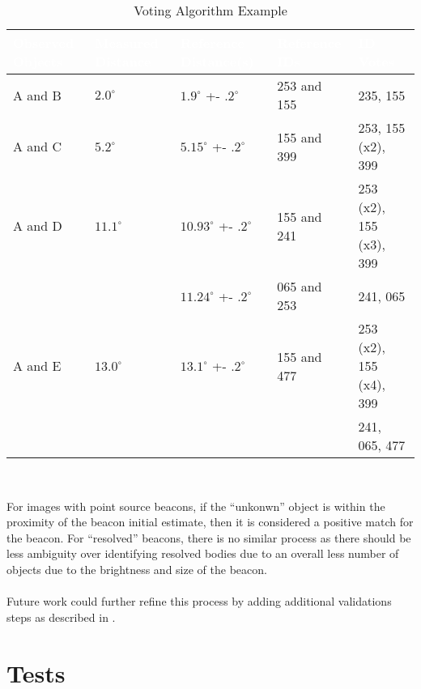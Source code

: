 \documentclass[]{DINOReportMemo}
\begin{document}
\begin{table}[H]
	\centering
	\caption{Voting Algorithm Example}
	\begin{tabular}{|l|l|l|l|l|}
		\hline
		\rowcolor{CU_Gold}
		\textcolor{white}{Observed Objects} & 
		\textcolor{white}{Measured Distance} & 
		\textcolor{white}{Reference Distance(s)} & 
		\textcolor{white}{Reference IDs} &
		\textcolor{white}{ID Votes}  \\ \hline
		A and B & $2.0^{\circ}$ & $1.9^{\circ}$ +- $.2^{\circ}$ 
		& 253 and 155 & 235, 155 \\ \hline
		A and C & $5.2^{\circ}$ & $5.15^{\circ}$ +- $.2^{\circ}$ 
		& 155 and 399 & 253, 155 (x2), 399 \\ \hline		
		A and D & $11.1^{\circ}$ & $10.93^{\circ}$ +- $.2^{\circ}$ 
		& 155 and 241 & 253 (x2), 155 (x3), 399 \\ 
		& & $11.24^{\circ}$ +- $.2^{\circ}$ 
		& 065 and 253 & 241, 065 \\ \hline
		A and E & $13.0^{\circ}$ & $13.1^{\circ}$ +- $.2^{\circ}$ 
		& 155 and 477 & 253 (x2), 155 (x4), 399 \\
		& & & & 241, 065, 477 \\ \hline	
	\end{tabular}
	\label{tab:voting} \\
\end{table} 

\noindent For images with point source beacons, if the ``unkonwn'' object is within the proximity of the beacon initial estimate, then it is considered a positive match for the beacon. For ``resolved'' beacons, there is no similar process as there should be less ambiguity over identifying resolved bodies due to an overall less number of objects due to the brightness and size of the beacon.\\
\\
Future work could further refine this process by adding additional validations steps as described in \cite{votingalgorithm}.

\newpage
\section{Tests}
\end{document}
